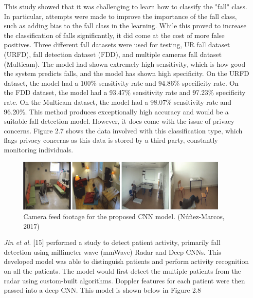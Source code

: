 This study showed that it was challenging to learn how to classify the "fall" class. In particular, attempts were made to improve the importance of the fall class, such as adding bias to the fall class in the learning. While this proved to increase the classification of falls significantly, it did come at the cost of more false positives. Three different fall datasets were used for testing, UR fall dataset (URFD), fall detection dataset (FDD), and multiple cameras fall dataset (Multicam). The model had shown extremely high sensitivity, which is how good the system predicts falls, and the model has shown high specificity. On the URFD dataset, the model had a 100\% sensitivity rate and 94.86\% specificity rate. On the FDD dataset, the model had a 93.47\% sensitivity rate and 97.23\% specificity rate. On the Multicam dataset, the model had a 98.07\% sensitivity rate and 96.20\%. This method produces exceptionally high accuracy and would be a suitable fall detection model. However, it does come with the issue of privacy concerns. Figure 2.7 shows the data involved with this classification type, which flags privacy concerns as this data is stored by a third party, constantly monitoring individuals. 

\begin{figure}[H]
    \centering
    \includegraphics[width=400px, keepaspectratio]{falllll.png}
    \vspace{1ex}%
    \caption{Camera feed footage for the proposed CNN model. (Núñez-Marcos, 2017)}
    \label{fig:my_label}
\end{figure}

\textit{Jin et al.} [15] performed a study to detect patient activity, primarily fall detection using millimeter wave (mmWave) Radar and Deep CNNs. This developed model was able to distinguish patients and perform activity recognition on all the patients. The model would first detect the multiple patients from the radar using custom-built algorithms. Doppler features for each patient were then passed into a deep CNN. This model is shown below in Figure 2.8

